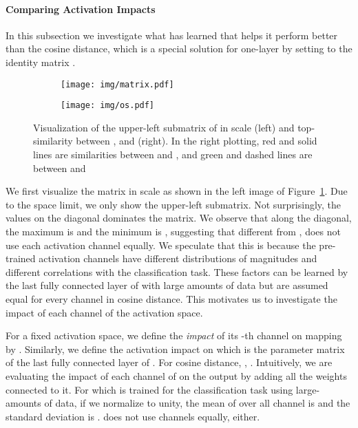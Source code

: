 \paragraph{Comparing Activation Impacts}\label{sec:cai}
In this subsection we investigate what  has learned that helps it perform better than the cosine distance, which is a special solution for one-layer  by setting  to the identity matrix .
\begin{figure}
    \begin{subfigure}{.455\linewidth}
        \hspace{-0.2in}\vspace{0.1in}
        \texttt{[image: img/matrix.pdf]}
    \end{subfigure}
    \vrule
    \begin{subfigure}{.53\linewidth}
        \hspace{0.05in}
        \texttt{[image: img/os.pdf]}
    \end{subfigure}
    \caption{Visualization of the upper-left  submatrix of  in  scale (left) and top- similarity between ,  and \smash{} (right). In the right plotting, red and solid lines are similarities between  and \smash{}, and green and dashed lines are between  and }
    \label{fig:vis}
\end{figure}
We first visualize the matrix  in  scale as shown in the left image of Figure~\ref{fig:vis}. Due to the space limit, we only show the upper-left  submatrix. Not surprisingly, the values on the diagonal dominates the matrix.
We observe that along the diagonal, the maximum is  and the minimum is , suggesting that different from ,  does not use each activation channel equally.
We speculate that this is because the pre-trained activation channels have different distributions of magnitudes and different correlations with the classification task.
These factors can be learned by the last fully connected layer of \smash{} with large amounts of data but are assumed equal for every channel in cosine distance.
This motivates us to investigate the impact of each channel of the activation space.

For a fixed activation space, we define the \emph{impact} of its -th channel on mapping  by
.
Similarly, we define the activation impact  on \smash{} which is the parameter matrix of the last fully connected layer of \smash{}. For cosine distance, , . Intuitively, we are evaluating the impact of each channel of  on the output by adding all the weights connected to it.
For \smash{} which is trained for the classification task using large-amounts of data, if we normalize \smash{} to unity,
the mean of \smash{} over all channel  is  and the standard deviation is .
\smash{} does not use channels equally, either.

